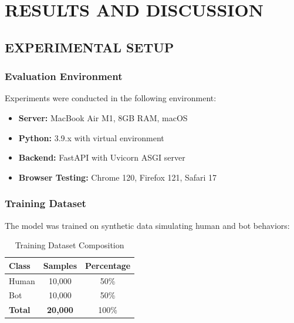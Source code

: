
\chapter{RESULTS AND DISCUSSION}

\section{EXPERIMENTAL SETUP}

\subsection{Evaluation Environment}

Experiments were conducted in the following environment:

\begin{itemize}
    \item \textbf{Server:} MacBook Air M1, 8GB RAM, macOS
    \item \textbf{Python:} 3.9.x with virtual environment
    \item \textbf{Backend:} FastAPI with Uvicorn ASGI server
    \item \textbf{Browser Testing:} Chrome 120, Firefox 121, Safari 17
\end{itemize}

\subsection{Training Dataset}

The model was trained on synthetic data simulating human and bot behaviors:

\begin{table}[H]
\centering
\caption{Training Dataset Composition}
\label{tab:dataset}
\begin{tabular}{|l|c|c|}
\hline
\textbf{Class} & \textbf{Samples} & \textbf{Percentage} \\
\hline
Human & 10,000 & 50\% \\
\hline
Bot & 10,000 & 50\% \\
\hline
\textbf{Total} & \textbf{20,000} & 100\% \\
\hline
\end{tabular}
\end{table}

